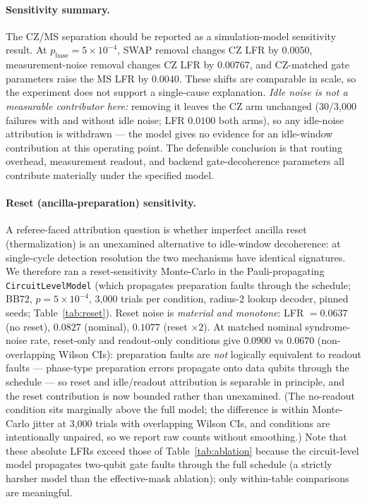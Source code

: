 \documentclass[11pt,a4paper]{article}
\begin{document}
\paragraph{Sensitivity summary.}
The CZ/MS separation should be reported as a simulation-model sensitivity result.
At $p_{\mathrm{base}}=5\times10^{-4}$, SWAP removal changes CZ LFR by $0.0050$, measurement-noise removal changes CZ LFR by $0.00767$, and CZ-matched gate parameters raise the MS LFR by $0.0040$.
These shifts are comparable in scale, so the experiment does not support a single-cause explanation.
\emph{Idle noise is not a measurable contributor here:} removing it
leaves the CZ arm unchanged (30/3{,}000 failures with and without idle
noise; LFR $0.0100$ both arms), so any idle-noise attribution is
withdrawn --- the model gives no evidence for an idle-window
contribution at this operating point.
The defensible conclusion is that routing overhead, measurement readout, and backend gate-decoherence parameters all contribute materially under the specified model.

\paragraph{Reset (ancilla-preparation) sensitivity.}
A referee-faced attribution question is whether imperfect ancilla reset
(thermalization) is an unexamined alternative to idle-window
decoherence: at single-cycle detection resolution the two mechanisms
have identical signatures. We therefore ran a reset-sensitivity
Monte-Carlo in the Pauli-propagating \texttt{CircuitLevelModel} (which
propagates preparation faults through the schedule; BB72,
$p=5\times10^{-4}$, 3{,}000 trials per condition, radius-2 lookup
decoder, pinned seeds; Table~\ref{tab:reset}).
Reset noise is \emph{material and monotone}: LFR $=0.0637$ (no reset),
$0.0827$ (nominal), $0.1077$ (reset $\times2$). At matched nominal
syndrome-noise rate, reset-only and readout-only conditions give
$0.0900$ vs $0.0670$ (non-overlapping Wilson CIs): preparation faults
are \emph{not} logically equivalent to readout faults --- phase-type
preparation errors propagate onto data qubits through the schedule ---
so reset and idle/readout attribution is separable in principle, and
the reset contribution is now bounded rather than unexamined.
(The no-readout condition sits marginally above the full model; the
difference is within Monte-Carlo jitter at 3{,}000 trials with
overlapping Wilson CIs, and conditions are intentionally unpaired, so
we report raw counts without smoothing.)
Note that these absolute LFRs exceed those of
Table~\ref{tab:ablation} because the circuit-level model propagates
two-qubit gate faults through the full schedule (a strictly harsher
model than the effective-mask ablation); only within-table comparisons
are meaningful.
\end{document}
